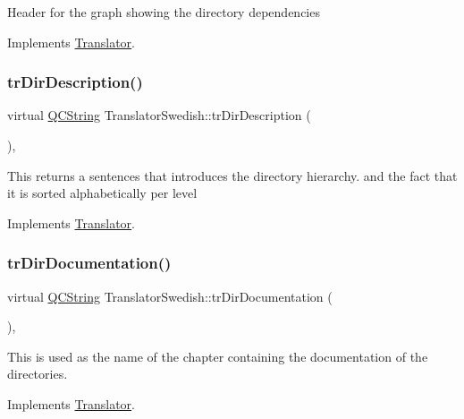 Header for the graph showing the directory dependencies 

Implements \mbox{\hyperlink{class_translator}{Translator}}.

\mbox{\label{class_translator_swedish_ac3d62ad28dd99aab5bf783cfff020d81}} 
\subsubsection{\texorpdfstring{trDirDescription()}{trDirDescription()}}
{\footnotesize\ttfamily virtual \mbox{\hyperlink{class_q_c_string}{Q\+C\+String}} Translator\+Swedish\+::tr\+Dir\+Description (\begin{DoxyParamCaption}{ }\end{DoxyParamCaption})\hspace{0.3cm}{\ttfamily [inline]}, {\ttfamily [virtual]}}

This returns a sentences that introduces the directory hierarchy. and the fact that it is sorted alphabetically per level 

Implements \mbox{\hyperlink{class_translator}{Translator}}.

\mbox{\label{class_translator_swedish_a8cd3c557970daf66ed9ed229fb291641}} 
\subsubsection{\texorpdfstring{trDirDocumentation()}{trDirDocumentation()}}
{\footnotesize\ttfamily virtual \mbox{\hyperlink{class_q_c_string}{Q\+C\+String}} Translator\+Swedish\+::tr\+Dir\+Documentation (\begin{DoxyParamCaption}{ }\end{DoxyParamCaption})\hspace{0.3cm}{\ttfamily [inline]}, {\ttfamily [virtual]}}

This is used as the name of the chapter containing the documentation of the directories. 

Implements \mbox{\hyperlink{class_translator}{Translator}}.

\mbox{\label{class_translator_swedish_aa24ce5b74364c50543a72bd10f25f77b}} 
